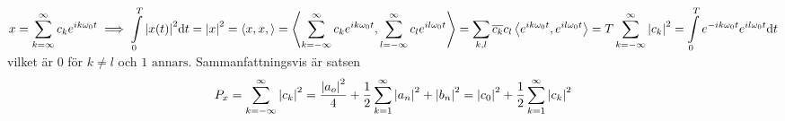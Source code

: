 \documentclass[a4paper]{article}
\begin{document}
\(
    x = \displaystyle\sum_{k=\infty}^\infty c_ke^{ik\omega_0 t} \implies \displaystyle\int\limits_0^T \abs{x(t)}^2 \dd t 
    = \abs{x}^2 = \left\langle x, x, \right\rangle 
    = \left\langle \displaystyle\sum_{k=-\infty}^\infty c_ke^{ik\omega_0 t}, \displaystyle\sum_{l=-\infty}^\infty c_le^{il\omega_0 t}\right\rangle
    = \displaystyle\sum_{k, l} \overline{c_k} c_l \left\langle e^{ik\omega_0 t}, e^{il\omega_0 t}\right\rangle
    = T \displaystyle\sum_{k = -\infty}^\infty \abs{c_k}^2 
    = \displaystyle\int\limits_0^T e^{-ik\omega_0 t}e^{il\omega_0 t} \dd t
\) vilket är \(
    0
\) för \(
    k\neq l
\) och \(
    1 \text{ annars.} 
\) Sammanfattningsvis är satsen \[
    P_x = \displaystyle\sum_{k=-\infty}^\infty \abs{c_k}^2 
    = \displaystyle\frac{\abs{a_o}^2}{4} + \frac{1}{2} \displaystyle\sum_{k=1}^\infty \abs{a_n}^2 + \abs{b_n}^2 
    = \abs{c_0}^2 + \frac{1}{2}\displaystyle\sum_{k=1}^\infty \abs{c_k}^2 
\]
\end{document}
